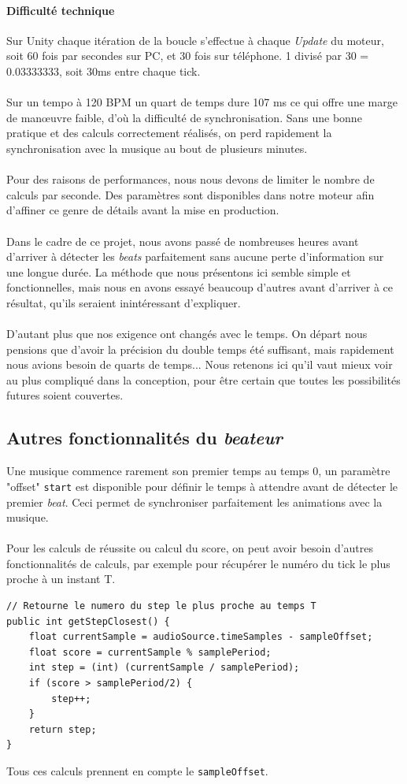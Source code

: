 \paragraph{Difficulté technique}
Sur Unity chaque itération de la boucle s'effectue à chaque \textit{Update} du moteur, soit 60 fois par secondes sur PC, et 30 fois sur téléphone. 1 divisé par 30 = 0.03333333, soit 30ms entre chaque tick.\\\\
Sur un tempo à 120 BPM un quart de temps dure 107 ms ce qui offre une marge de manœuvre faible, d'où la difficulté de synchronisation. Sans une bonne pratique et des calculs correctement réalisés, on perd rapidement la synchronisation avec la musique au bout de plusieurs minutes.\\\\
Pour des raisons de performances, nous nous devons de limiter le nombre de calculs par seconde. Des paramètres sont disponibles dans notre moteur afin d'affiner ce genre de détails avant la mise en production.\\\\
Dans le cadre de ce projet, nous avons passé de nombreuses heures avant d'arriver à détecter les \textit{beats} parfaitement sans aucune perte d'information sur une longue durée. La méthode que nous présentons ici semble simple et fonctionnelles, mais nous en avons essayé beaucoup d'autres avant d'arriver à ce résultat, qu'ils seraient inintéressant d'expliquer.\\\\
D'autant plus que nos exigence ont changés avec le temps. On départ nous pensions que d'avoir la précision du double temps été suffisant, mais rapidement nous avions besoin de quarts de temps... Nous retenons ici qu'il vaut mieux voir au plus compliqué dans la conception, pour être certain que toutes les possibilités futures soient couvertes.


\subsection{Autres fonctionnalités du \textit{beateur}}
Une musique commence rarement son premier temps au temps 0, un paramètre "offset" \texttt{start} est disponible pour définir le temps à attendre avant de détecter le premier \textit{beat}. Ceci permet de synchroniser parfaitement les animations avec la musique.
\\\\
Pour les calculs de réussite ou calcul du score, on peut avoir besoin d'autres fonctionnalités de calculs, par exemple pour récupérer le numéro du tick le plus proche à un instant T.
\\
\begin{lstlisting}
// Retourne le numero du step le plus proche au temps T
public int getStepClosest() {
    float currentSample = audioSource.timeSamples - sampleOffset;
    float score = currentSample % samplePeriod;
    int step = (int) (currentSample / samplePeriod);
    if (score > samplePeriod/2) {
        step++;
    }
    return step;
}
\end{lstlisting}
Tous ces calculs prennent en compte le \texttt{sampleOffset}.

